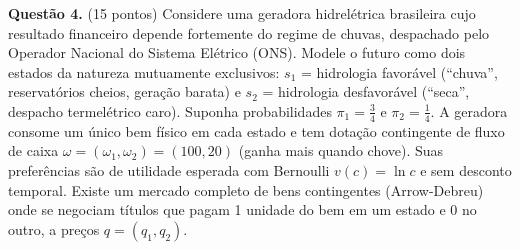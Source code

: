 \textbf{Questão 4.} (15 pontos) Considere uma geradora hidrelétrica brasileira cujo resultado financeiro depende fortemente do regime de chuvas, despachado pelo Operador Nacional do Sistema Elétrico (ONS). Modele o futuro como dois estados da natureza mutuamente exclusivos: $s_1$ = hidrologia favorável (``chuva'', reservatórios cheios, geração barata) e $s_2$ = hidrologia desfavorável (``seca'', despacho termelétrico caro). Suponha probabilidades $\pi_1=\tfrac34$ e $\pi_2=\tfrac14$. A geradora consome um único bem físico em cada estado e tem dotação contingente de fluxo de caixa $\omega=(\omega_1,\omega_2)=(100,20)$ (ganha mais quando chove). Suas preferências são de utilidade esperada com Bernoulli $v(c)=\ln c$ e sem desconto temporal. Existe um mercado completo de bens contingentes (Arrow-Debreu) onde se negociam títulos que pagam 1 unidade do bem em um estado e 0 no outro, a preços $q=(q_1,q_2)$.


